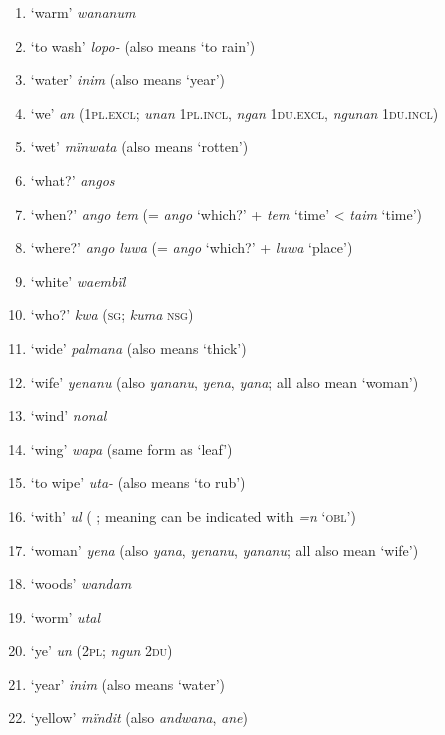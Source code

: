 \begin{enumerate}[noitemsep, label={\arabic*}, align=left, widest=190, labelsep=1ex,leftmargin=*]
\item ‘warm’ \textit{wananum}

\item ‘to wash’ \textit{lopo-} (also means ‘to rain’)

\item ‘water’ \textit{inim} (also means ‘year’)

\item ‘we’ \textit{an} (1\textsc{pl.excl;} \textit{unan} 1\textsc{pl.incl}, \textit{ngan} 1\textsc{du.excl,} \textit{ngunan} 1\textsc{du.incl})

\item ‘wet’ \textit{mïnwata} (also means ‘rotten’)

\item ‘what?’ \textit{angos}

\item ‘when?’ \textit{ango tem} (= \textit{ango} ‘which?’ + \textit{tem} ‘time’ <  \textit{taim} ‘time’)

\item ‘where?’ \textit{ango luwa} (= \textit{ango} ‘which?’ + \textit{luwa} ‘place’)

\item ‘white’ \textit{waembïl}

\item ‘who?’ \textit{kwa} (\textsc{sg;} \textit{kuma} \textsc{nsg)}

\item ‘wide’ \textit{palmana} (also means ‘thick’)

\item ‘wife’ \textit{yenanu} (also \textit{yananu}, \textit{yena}, \textit{yana}; all also mean ‘woman’)

\item ‘wind’ \textit{nonal}

\item ‘wing’ \textit{wapa} (same form as ‘leaf’)

\item ‘to wipe’ \textit{uta-} (also means ‘to rub’)

\item ‘with’ \textit{ul} ( ;  meaning can be indicated with  \textit{=n} ‘\textsc{obl}’)

\item ‘woman’ \textit{yena} (also \textit{yana}, \textit{yenanu}, \textit{yananu}; all also mean ‘wife’)

\item ‘woods’ \textit{wandam}

\item ‘worm’ \textit{utal}

\item ‘ye’ \textit{un} (2\textsc{pl}; \textit{ngun} 2\textsc{du})

\item ‘year’ \textit{inim} (also means ‘water’)

\item ‘yellow’ \textit{mïndit} (also \textit{andwana}, \textit{ane})
\end{enumerate}

